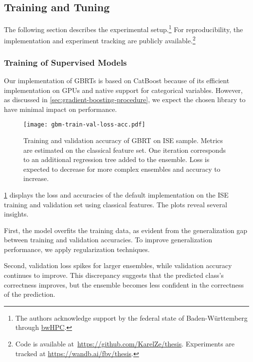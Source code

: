 \subsection{Training and Tuning}\label{sec:training-and-tuning}

The following section describes the experimental setup.\footnote{The authors acknowledge support by the federal state of Baden-Württemberg through \href{https://www.bwhpc.de/}{bwHPC}.} For reproducibility, the implementation and experiment tracking are publicly available.\footnote{Code is available at~\url{https://github.com/KarelZe/thesis}. Experiments are tracked at \url{https://wandb.ai/fbv/thesis}.}

\subsubsection{Training of Supervised
    Models}\label{sec:training-of-supervised-models}

Our implementation of \glspl{GBRT} is based on CatBoost \autocite[][5--6]{prokhorenkovaCatBoostUnbiasedBoosting2018} because of its efficient implementation on \glspl{GPU} and native support for categorical variables. However, as discussed in \cref{sec:gradient-boosting-procedure}, we expect the chosen library to have minimal impact on performance.

\begin{figure}[ht]
    \centering
    \texttt{[image: gbm-train-val-loss-acc.pdf]}
    \caption[Training and Validation Accuracy of Gradient-Boosting]{Training and validation accuracy of \gls{GBRT} on \gls{ISE} sample. Metrics are estimated on the classical feature set. One iteration corresponds to an additional regression tree added to the ensemble. Loss is expected to decrease for more complex ensembles and accuracy to increase.}
    \label{fig:gbm-train-val-loss-acc}
\end{figure}

\cref{fig:gbm-train-val-loss-acc} displays the loss and accuracies of the default implementation on the \gls{ISE} training and validation set using classical features. The plots reveal several insights.

First, the model overfits the training data, as evident from the generalization gap between training and validation accuracies. To improve generalization performance, we apply regularization techniques.

Second, validation loss spikes for larger ensembles, while validation accuracy continues to improve. This discrepancy suggests that the predicted class's correctness improves, but the ensemble becomes less confident in the correctness of the prediction.

